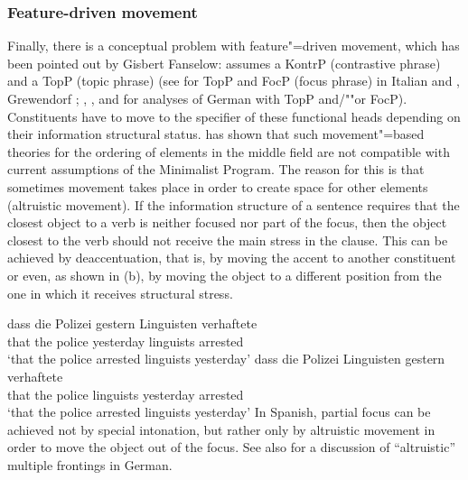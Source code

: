 \subsubsection{Feature-driven movement}
\label{sec-feature-driven-movement}

Finally, there is a conceptual problem with feature"=driven movement, which has been pointed out by Gisbert Fanselow:
\mbox{}\citet[]{Frey2004a} assumes a KontrP 
(contrastive phrase) and \citet{Frey2004b-u} a TopP (topic phrase) (see  for TopP and
FocP (focus phrase) in Italian and  
, Grewendorf \citeyearpar[, 240]{Grewendorf2002a}; \citeyear{Grewendorf2009a},
,  and  for analyses of German with TopP and/""or FocP). 
Constituents have to move to the specifier of these functional heads depending on their information structural status. \citet{Fanselow2003b} has
shown that such movement"=based theories for the ordering of elements in the middle field are not compatible with current assumptions of the 
Minimalist Program\indexmp. The reason for this is that sometimes movement takes place in order to create space for other elements (altruistic 
movement).
If the information structure of a sentence requires that the closest object to a verb is neither
focused nor part of the focus, then the object closest to the verb should not
receive the main stress in the clause. This can be achieved by deaccentuation, that is, by moving
the accent to another constituent or even, as shown in (b), by moving the object to a different position from the one in which it receives structural stress.

\eal
\ex 
\gll dass die Polizei gestern Linguisten verhaftete\\
	 that the police yesterday linguists arrested\\
\glt `that the police arrested linguists yesterday'
\ex 
\gll dass die Polizei Linguisten gestern verhaftete\\
	 that the police linguists yesterday arrested\\
\glt `that the police arrested linguists yesterday'
\zl
%
In Spanish, partial focus can be achieved not by special intonation, but rather only by altruistic movement in order to move the
object out of the focus. See also  for a discussion of ``altruistic'' multiple frontings in German.

